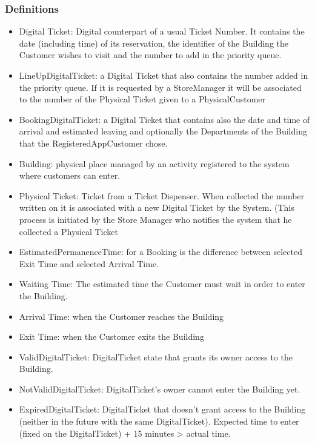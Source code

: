 \documentclass{article}
\begin{document}
         	\subsubsection{Definitions}
		\begin{itemize}
			\item \textcolor{BrickRed}{Digital Ticket}: Digital counterpart of a usual Ticket Number. It contains the date (including time) of its reservation, the identifier of the Building the Customer wishes to visit and the number to add in the priority queue.
			\item \textcolor{BrickRed}{LineUpDigitalTicket}: a Digital Ticket that also contains the number added in the priority queue. If it is requested by a StoreManager it will be associated to the number of the Physical Ticket given to a PhysicalCustomer
			\item \textcolor{BrickRed}{BookingDigitalTicket}: a Digital Ticket that contains also the date and time of arrival and estimated leaving and optionally the Departments of the Building that the RegisteredAppCustomer chose.
			\item \textcolor{BrickRed}{Building}: physical place managed by an activity registered to the system where customers can enter.
			\item \textcolor{BrickRed}{Physical Ticket}: Ticket from a Ticket Dispenser. When collected the number written on it is associated with a new Digital Ticket by the System. (This process is initiated by the Store Manager who notifies the system that he collected a Physical Ticket
			\item \textcolor{BrickRed}{EstimatedPermanenceTime}: for a Booking is the difference between selected Exit Time and selected Arrival Time.
			\item \textcolor{BrickRed}{Waiting Time}: The estimated time the Customer must wait in order to enter the Building.
			\item \textcolor{BrickRed}{Arrival Time}: when the Customer reaches the Building
			\item \textcolor{BrickRed}{Exit Time}: when the Customer exits the Building
			\item \textcolor{BrickRed}{ValidDigitalTicket}: DigitalTicket state that grants its owner access to the Building.
			\item \textcolor{BrickRed}{NotValidDigitalTicket}: DigitalTicket’s owner cannot enter the Building yet.
			\item \textcolor{BrickRed}{ExpiredDigitalTicket}: DigitalTicket that doesn’t grant access to the Building (neither in the future with the same DigitalTicket). Expected time to enter (fixed on the DigitalTicket) + 15 minutes > actual time.

\end{itemize}
\end{document}
